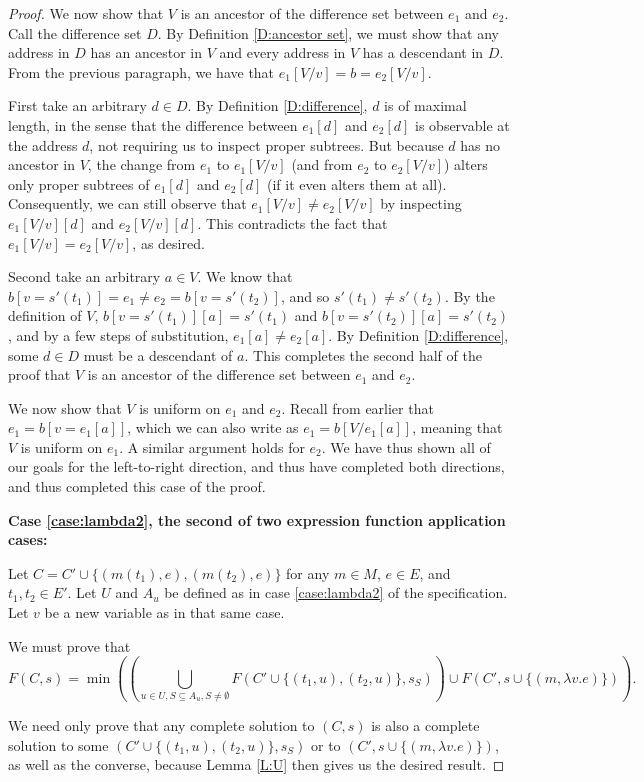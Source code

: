 \documentclass{article}
\begin{document}
\begin{proof}
We now show that $V$ is an ancestor of the difference set between $e_1$ and $e_2$.  Call the difference set $D$.  By Definition \ref{D:ancestor set}, we must show that any address in $D$ has an ancestor in $V$ and every address in $V$ has a descendant in $D$.  From the previous paragraph, we have that $e_1[V/v]=b=e_2[V/v]$.

First take an arbitrary $d\in D$.  By Definition \ref{D:difference}, $d$ is of maximal length, in the sense that the difference between $e_1[d]$ and $e_2[d]$ is observable at the address $d$, not requiring us to inspect proper subtrees.  But because $d$ has no ancestor in $V$, the change from $e_1$ to $e_1[V/v]$ (and from $e_2$ to $e_2[V/v]$) alters only proper subtrees of $e_1[d]$ and $e_2[d]$ (if it even alters them at all).  Consequently, we can still observe that $e_1[V/v]\neq e_2[V/v]$ by inspecting $e_1[V/v][d]$ and $e_2[V/v][d]$.  This contradicts the fact that $e_1[V/v]=e_2[V/v]$, as desired.

Second take an arbitrary $a\in V$.  We know that $b[v=s'(t_1)]=e_1\neq e_2=b[v=s'(t_2)]$, and so $s'(t_1)\neq s'(t_2)$.  By the definition of $V$, $b[v=s'(t_1)][a]=s'(t_1)$ and $b[v=s'(t_2)][a]=s'(t_2)$, and by a few steps of substitution, $e_1[a]\neq e_2[a]$.  By Definition \ref{D:difference}, some $d\in D$ must be a descendant of $a$.  This completes the second half of the proof that $V$ is an ancestor of the difference set between $e_1$ and $e_2$.

We now show that $V$ is uniform on $e_1$ and $e_2$.  Recall from earlier that $e_1=b[v=e_1[a]]$, which we can also write as $e_1=b[V/e_1[a]]$, meaning that $V$ is uniform on $e_1$.  A similar argument holds for $e_2$.  We have thus shown all of our goals for the left-to-right direction, and thus have completed both directions, and thus completed this case of the proof.

{\bf Case \ref{case:lambda2}, the second of two expression function application cases:}

Let $C=C'\cup\{(m(t_1),e),(m(t_2),e)\}$ for any $m\in M$, $e\in E$, and $t_1,t_2\in E'$.  Let $U$ and $A_u$ be defined as in case \ref{case:lambda2} of the specification.  Let $v$ be a new variable as in that same case.

We must prove that
	$$ 	F(C,s) = \min\left(\left(\bigcup_{u\in U,S\subseteq A_u,S\neq\emptyset}
			F(C'\cup\{(t_1,u),(t_2,u)\},s_S)\right)
            	\cup F(C',s\cup\{(m,\lambda v.e)\})\right).	$$

We need only prove that any complete solution to $(C,s)$ is also a complete solution to some $(C'\cup\{(t_1,u),(t_2,u)\},s_S)$ or to $(C',s\cup\{(m,\lambda v.e)\})$, as well as the converse, because Lemma \ref{L:U} then gives us the desired result.


\end{proof}
\end{document}
